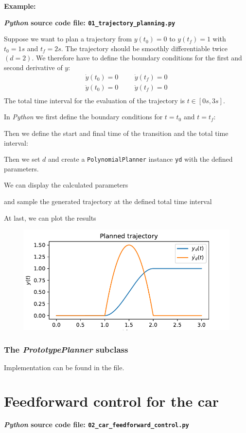 \documentclass[a4paper,11pt,headings=standardclasses,parskip=half]{scrartcl}
\newcommand{\listcode}[3]{}
\newcommand{\listcodeplanning}[2]{\listcode{#1}{#2}{../sim/01_trajectory_planning.py}}
\newcommand{\py}{\emph{Python}\xspace}
\begin{document}
\textbf{Example:}

\textbf{\py source code file: \texttt{01\_trajectory\_planning.py}}

Suppose we want to plan a trajectory from $y(t_0)=0$ to $y(t_f) = 1$ with $t_0=1s$ and $t_f = 2s$. The trajectory should be smoothly differentiable twice $(d=2)$. We therefore have to define the boundary conditions for the first and second derivative of $y$: 
\begin{align*}
\dot{y}(t_0)=0 &&& \dot{y}(t_f)=0 \\
\ddot{y}(t_0)=0 &&& \ddot{y}(t_f)=0 \\
\end{align*}
The total time interval for the evaluation of the trajectory is $t\in[0s,3s]$.

In \py we first define the boundary conditions for $t=t_0$ and $t=t_f$:
\listcodeplanning{7}{8}
Then we define the start and final time of the transition and the total time interval:
\listcodeplanning{9}{11}
Then we set $d$ and create a \texttt{PolynomialPlanner} instance \texttt{yd} with the defined parameters.
\listcodeplanning{12}{13}
We can display the calculated parameters
\listcodeplanning{15}{16}
and sample the generated trajectory at the defined total time interval
\listcodeplanning{18}{19}
At last, we can plot the results
\listcodeplanning{21}{27}
\begin{figure}[ht]
\centering
\includegraphics[scale=1]{img/planned_trajectory.pdf}
\end{figure}
\subsubsection{The \emph{PrototypePlanner} subclass}
Implementation can be found in the file.
\newpage
\section{Feedforward control for the car}
\textbf{\py source code file: \texttt{02\_car\_feedforward\_control.py}}
\end{document}
